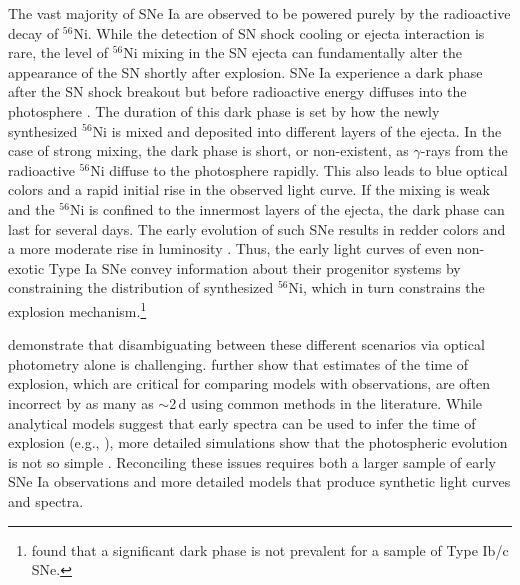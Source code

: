 \documentclass[twocolumn]{aastex61}
\begin{document}
The vast majority of SNe Ia are observed 
to be powered purely by the radioactive decay of $^{56}$Ni. 
While the detection of SN shock cooling or ejecta interaction is rare, the level of $^{56}$Ni mixing in the SN ejecta can fundamentally alter the appearance of the SN shortly after explosion. SNe Ia experience a dark phase after
the SN shock breakout but before radioactive energy  
diffuses into the photosphere \citep{2014ApJ...784...85P}. The 
duration of this dark phase is set by how the newly synthesized 
$^{56}$Ni is mixed and deposited into different layers of the ejecta. In the case of strong mixing, the dark phase is short, or 
non-existent, as $\gamma$-rays from the radioactive $^{56}$Ni diffuse to the photosphere rapidly. This also leads to blue optical colors and a rapid initial rise in the observed light curve. If the mixing is weak and the $^{56}$Ni is confined to the innermost layers of the ejecta, the dark phase can last for several days. The early evolution of such SNe results in redder colors and a more moderate rise in luminosity \citep{2016ApJ...826...96P}. Thus, the early light curves of even non-exotic Type Ia SNe convey information about their progenitor systems by constraining the distribution of synthesized $^{56}$Ni, which in turn constrains the explosion mechanism.\footnote{\citet{2015A&A...574A..60T} found that a significant dark phase is not prevalent for a sample of Type Ib/c SNe.}

\citet{2017arXiv170603613N} demonstrate that disambiguating between these different scenarios via optical photometry alone is challenging. \citeauthor{2017arXiv170603613N} further show that estimates of the time of explosion, which are critical for comparing models with observations, are often incorrect by as many as $\sim$2\,d using common methods in the literature. While analytical models suggest that early spectra can be used to infer the time of explosion (e.g., \citealt{2014ApJ...784...85P}), more detailed simulations show that the photospheric evolution is not so simple \citep{2016ApJ...826...96P}. Reconciling these issues requires both a larger sample of early SNe Ia observations and more detailed models that produce synthetic light curves and spectra.
\end{document}
